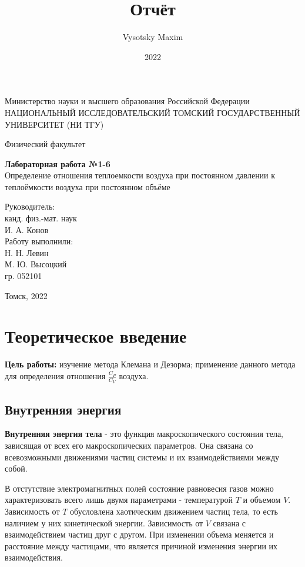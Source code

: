 \documentclass[a4paper,12pt]{article}
\author{Vysotsky Maxim}
\title{Отчёт}
\date{2022}
\begin{document}
	\begin{titlepage}
	\begin{center}
		{Министерство науки и высшего образования Российской Федерации
			НАЦИОНАЛЬНЫЙ ИССЛЕДОВАТЕЛЬСКИЙ ТОМСКИЙ
			ГОСУДАРСТВЕННЫЙ УНИВЕРСИТЕТ (НИ ТГУ)}
	\end{center}
	\begin{center}
		{Физический факультет}
	\end{center}
	
	
	\vspace{8cm}
	{
		\begin{center}
			{\bf Лабораторная работа №1-6}\\
			Определение отношения теплоемкости воздуха при постоянном давлении к теплоёмкости воздуха при постоянном объёме
		\end{center}
	}
	\vspace{2cm}
	\begin{flushright}
		{Руководитель:\\ канд. физ.-мат. наук\\
			И. А. Конов\\
			Работу выполнили:\\
			Н. Н. Левин\\
			М. Ю. Высоцкий\\
			\vspace{0.2cm}
			гр. 052101}
	\end{flushright}
	\vspace{3cm}
	\begin{center}
		Томск, 2022
	\end{center}
\end{titlepage}

\section{Теоретическое введение}
\textbf{Цель работы:} изучение метода Клемана и Дезорма;
применение данного метода для определения отношения $\frac{C_P}{C_V}$ 
воздуха.
\subsection{Внутренняя энергия}
\hspace{\parindent}\textbf{Внутренняя энергия тела} - это функция макроскопического состояния тела, зависящая от всех его макроскопических параметров. Она связана со всевозможными движениями частиц системы и их взаимодействиями между собой. 

В отстутствие электромагнитных полей состояние равновесия газов можно характеризовать всего лишь двумя параметрами - температурой $T$ и объемом $V$. Зависимость от $T$ обусловлена хаотическим движением частиц тела, то есть наличием у них кинетической энергии. Зависимость от $V$ связана с взаимодействием частиц друг с другом. При изменении объема меняется и расстояние между частицами, что является причиной изменения энергии их взаимодействия.
\end{document}
